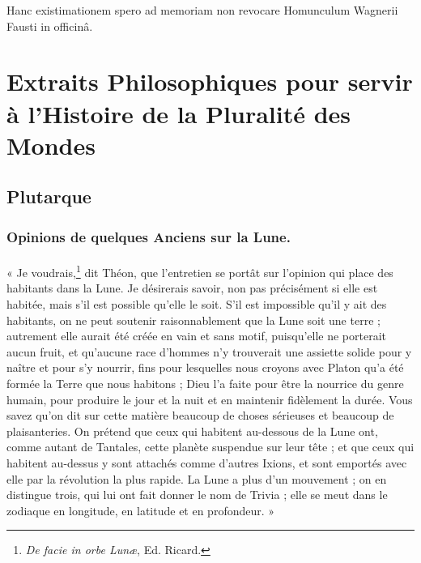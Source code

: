 \documentclass[a4paper, 11pt, oneside]{article}
\begin{document}
Hanc existimationem spero ad memoriam non revocare Homunculum Wagnerii Fausti in officinâ.
\clearpage
\section{Extraits Philosophiques pour servir à l'Histoire de la Pluralité des Mondes}
\subsection{Plutarque}
\subsubsection{Opinions de quelques Anciens sur la Lune.}
\paragraph{}
« Je voudrais,\footnote{\emph{De facie in orbe Lunæ}, Ed. Ricard.} dit Théon, que l'entretien se portât sur l'opinion qui place des habitants dans la Lune. Je désirerais savoir, non pas précisément si elle est habitée, mais s'il est possible qu'elle le soit. S'il est impossible qu'il y ait des habitants, on ne peut soutenir raisonnablement que la Lune soit une terre ; autrement elle aurait été créée en vain et sans motif, puisqu'elle ne porterait aucun fruit, et qu'aucune race d'hommes n'y trouverait une assiette solide pour y naître et pour s'y nourrir, fins pour lesquelles nous croyons avec Platon qu'a été formée la Terre que nous habitons ; Dieu l'a faite pour être la nourrice du genre humain, pour produire le jour et la nuit et en maintenir fidèlement la durée. Vous savez qu'on dit sur cette matière beaucoup de choses sérieuses et beaucoup de plaisanteries. On prétend que ceux qui habitent au-dessous de la Lune ont, comme autant de Tantales, cette planète suspendue sur leur tête ; et que ceux qui habitent au-dessus y sont attachés comme d'autres Ixions, et sont emportés avec elle par la révolution la plus rapide. La Lune a plus d'un mouvement ; on en distingue trois, qui lui ont fait donner le nom de Trivia ; elle se meut dans le zodiaque en longitude, en latitude et en profondeur. »
\end{document}
